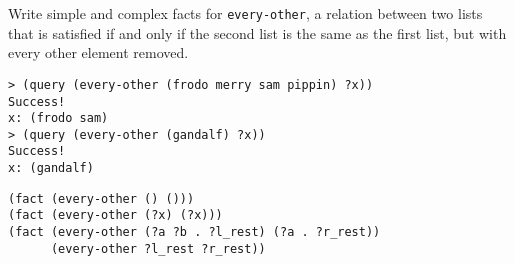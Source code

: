\question Write simple and complex facts for {\tt every-other}, a relation
between two lists that is satisfied if and only if the second list is the same
as the first list, but with every other element removed.

\begin{lstlisting}
> (query (every-other (frodo merry sam pippin) ?x))
Success!
x: (frodo sam)
> (query (every-other (gandalf) ?x))
Success!
x: (gandalf)
\end{lstlisting}

\begin{solution}[1.9in]
\begin{lstlisting}
(fact (every-other () ()))
(fact (every-other (?x) (?x)))
(fact (every-other (?a ?b . ?l_rest) (?a . ?r_rest))
      (every-other ?l_rest ?r_rest))
\end{lstlisting}
\end{solution}

